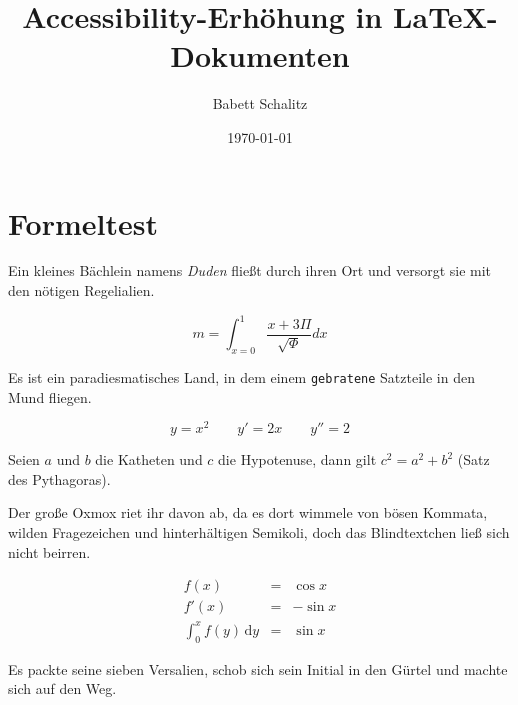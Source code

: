 \documentclass[%
	12pt,%
	a4paper,%
	oneside,%
 liststotoc, idxtotoc, bibtotoc, %
	halfparskip,%
	nochapterprefix,%
	appendixprefix, %
smallheadings,%
]{scrreprt}
\newcommand{\alt}[1]{}%
\begin{document}
\title{Accessibility-Erhöhung in \LaTeX-Dokumenten}
\author{Babett Schalitz}
\date{\today}
%
\maketitle

\tableofcontents

\listoffigures
\listoftables

\chapter{Formeltest}
\label{sec:Formeltest}

Ein kleines Bächlein namens \emph{Duden} fließt durch ihren Ort und versorgt sie mit den nötigen Regelialien.

\[ \alt{m = int^{1}_{x=0}{frac{x + 3 Pi}{sqrt{Phi}}} dx} m = \int^{1}_{x=0}{\frac{x + 3 \Pi}{\sqrt{\Phi}}} dx \]

Es ist ein paradiesmatisches Land, in dem einem \texttt{gebratene} Satzteile in den Mund fliegen. 

\begin{displaymath}
\alt{y=x^{2} y'=2x y''=2}
y=x^{2} \qquad
y'=2x \qquad
y''=2
\end{displaymath}

Seien \(\alt{a}a\) und \(\alt{b}b\) die Katheten und \(\alt{c}c\) die Hypotenuse, dann gilt \(\alt{c^{2}=a^{2}+b^{2}} c^{2}=a^{2}+b^{2}\) (Satz des Pythagoras).

Der große Oxmox riet ihr davon ab, da es dort wimmele von bösen Kommata, wilden Fragezeichen und hinterhältigen Semikoli, doch das Blindtextchen ließ sich nicht beirren. 

\begin{eqnarray}
\alt{f(x) = cos x  f'(x) = -sin x   int_{0}^{x} f(y),mathrm{d}y = sin x}
f(x) & = & \cos x \\
f'(x) & = & -\sin x \\
\int_{0}^{x} f(y)\,\mathrm{d}y &
= & \sin x
\end{eqnarray}

Es packte seine sieben Versalien, schob sich sein Initial in den Gürtel und machte sich auf den Weg.

\end{document}
